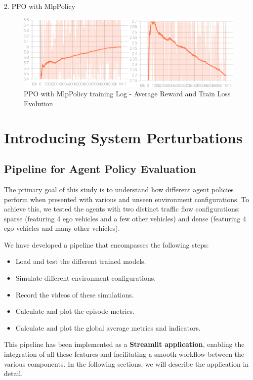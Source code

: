 2. PPO with MlpPolicy

\begin{figure}[H]
    \centering
    \includegraphics[height=0.20\textheight]{images/ppo_mlp.png} 
    \caption{PPO with MlpPolicy training Log - Average Reward and Train Loss Evolution}
\end{figure}


\section{Introducing System Perturbations}

\subsection{Pipeline for Agent Policy Evaluation}

The primary goal of this study is to understand how different agent policies perform when presented with various and unseen environment configurations. 
To achieve this, we tested the agents with two distinct traffic flow configurations: sparse (featuring 4 ego vehicles and a few other vehicles) 
and dense (featuring 4 ego vehicles and many other vehicles). 

We have developed a pipeline that encompasses the following steps:
\begin{itemize}
    \item Load and test the different trained models.
    \item Simulate different environment configurations.
    \item Record the videos of these simulations.
    \item Calculate and plot the episode metrics.
    \item Calculate and plot the global average metrics and indicators.
\end{itemize}

This pipeline has been implemented as a \textbf{Streamlit application}, enabling the integration of all these features and facilitating a smooth 
workflow between the various components. In the following sections, we will describe the application in detail.

